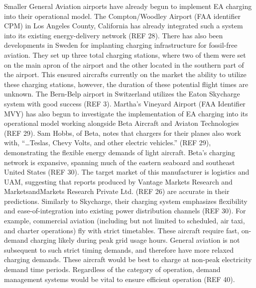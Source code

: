 \documentclass[../main.tex]{subfiles}
\begin{document}
Smaller General Aviation airports have already begun to implement EA charging into their operational model. The Compton/Woodley Airport (FAA identifier CPM) in Los Angeles County, California has already integrated such a system into its existing energy-delivery network (REF 28). There has also been developments in Sweden for implanting charging infrastructure for fossil-free aviation. They set up three total charging stations, where two of them were set on the main apron of the airport and the other located in the southern part of the airport. This ensured aircrafts currently on the market the ability to utilize these charging stations, however, the duration of these potential flight times are unknown. The Bern-Belp airport in Switzerland utilizes the Eaton Skycharge system with good success (REF 3). Martha’s Vineyard Airport (FAA Identifier MVY) has also begun to investigate the implementation of EA charging into its operational model working alongside Beta Aircraft and Aviaton Technologies (REF 29). Sam Hobbs, of Beta, notes that chargers for their planes also work with, “…Teslas, Chevy Volts, and other electric vehicles.” (REF 29), demonstrating the flexible energy demands of light aircraft. Beta’s charging network is expansive, spanning much of the eastern seaboard and southeast United States (REF 30). The target market of this manufacturer is logistics and UAM, suggesting that reports produced by Vantage Markets Research \cite{ref24} and MarketsandMarkets Research Private Ltd. (REF 26) are accurate in their predictions. Similarly to Skycharge, their charging system emphasizes flexibility and ease-of-integration into existing power distribution channels (REF 30). For example, commercial aviation (including but not limited to scheduled, air taxi, and charter operations) fly with strict timetables. These aircraft require fast, on-demand charging likely during peak grid usage hours. General aviation is not subsequent to such strict timing demands, and therefore have more relaxed charging demands. These aircraft would be best to charge at non-peak electricity demand time periods. Regardless of the category of operation, demand management systems would be vital to ensure efficient operation (REF 40).\par
\end{document}

